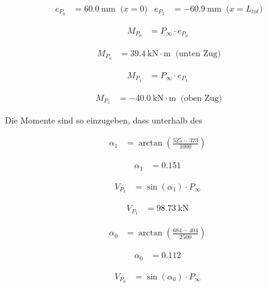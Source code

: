\documentclass[
  11pt,
  letterpaper,
]{scrreprt}
\begin{document}
$$
\begin{aligned}
e_{P_{0}} &= 60.0\ \mathrm{mm} \; \;\textrm{($x=0$)}
 &e_{P_{1}} &= -60.9\ \mathrm{mm} \; \;\textrm{($x=L_{tot}$)}
\end{aligned}
$$

$$
\begin{aligned}
M_{P_{0}} &= P_{\infty} \cdot e_{P_{0}} \; 
\end{aligned}
$$

$$
\begin{aligned}
M_{P_{0}} &= 39.4\ \mathrm{kN} \cdot \mathrm{m} \; \;\textrm{(unten Zug)}
\end{aligned}
$$

$$
\begin{aligned}
M_{P_{1}} &= P_{\infty} \cdot e_{P_{1}} \; 
\end{aligned}
$$

$$
\begin{aligned}
M_{P_{1}} &= -40.0\ \mathrm{kN} \cdot \mathrm{m} \; \;\textrm{(oben Zug)}
\end{aligned}
$$

Die Momente sind so einzugeben, dass unterhalb des

$$
\begin{aligned}
\alpha_{1} &= \operatorname{arctan} { \left( \frac{ 525 - 373 }{ 1000 } \right) } \; 
\end{aligned}
$$

$$
\begin{aligned}
\alpha_{1} &= 0.151 \;
\end{aligned}
$$

$$
\begin{aligned}
V_{P_{1}} &= \sin \left( \alpha_{1} \right) \cdot P_{\infty} \; 
\end{aligned}
$$

$$
\begin{aligned}
V_{P_{1}} &= 98.73\ \mathrm{kN} \;
\end{aligned}
$$

$$
\begin{aligned}
\alpha_{0} &= \operatorname{arctan} { \left( \frac{ 684 - 404 }{ 2500 } \right) } \; 
\end{aligned}
$$

$$
\begin{aligned}
\alpha_{0} &= 0.112 \;
\end{aligned}
$$

$$
\begin{aligned}
V_{P_{0}} &= \sin \left( \alpha_{0} \right) \cdot P_{\infty} \; 
\end{aligned}
$$
\end{document}
